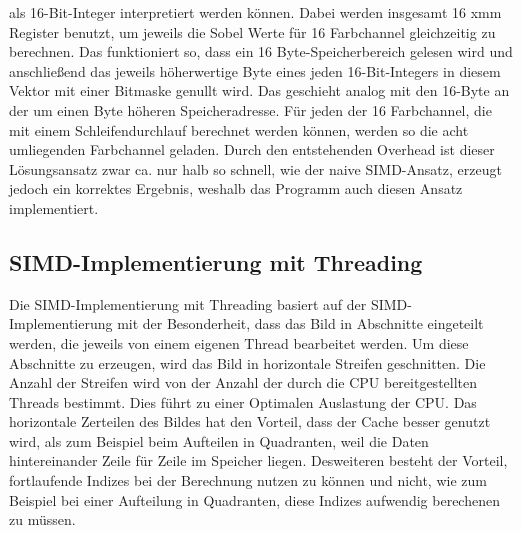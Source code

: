 \documentclass[course=erap]{aspdoc}
\begin{document}
als 16-Bit-Integer interpretiert werden können.
Dabei werden insgesamt 16 xmm Register benutzt, um jeweils die Sobel Werte für 16 Farbchannel gleichzeitig zu berechnen.
Das funktioniert so, dass ein 16 Byte-Speicherbereich gelesen wird und anschließend das jeweils höherwertige Byte eines jeden
16-Bit-Integers in diesem Vektor mit einer Bitmaske genullt wird.
Das geschieht analog mit den 16-Byte an der um einen Byte höheren Speicheradresse.
Für jeden der 16 Farbchannel, die mit einem Schleifendurchlauf berechnet werden können, werden so die acht umliegenden Farbchannel geladen.
Durch den entstehenden Overhead ist dieser Lösungsansatz zwar ca. nur halb so schnell, wie der naive SIMD-Ansatz, erzeugt jedoch ein korrektes Ergebnis, weshalb das Programm auch diesen Ansatz implementiert.

\subsection{SIMD-Implementierung mit Threading}
\label{sec:simd-threading}
Die SIMD-Implementierung mit Threading basiert auf der SIMD-Implementierung mit der Besonderheit, dass das Bild in Abschnitte eingeteilt werden, die jeweils von einem eigenen Thread bearbeitet werden.
Um diese Abschnitte zu erzeugen, wird das Bild in horizontale Streifen geschnitten.
Die Anzahl der Streifen wird von der Anzahl der durch die CPU bereitgestellten Threads bestimmt.
Dies führt zu einer Optimalen Auslastung der CPU.
Das horizontale Zerteilen des Bildes hat den Vorteil, dass der Cache besser genutzt wird, als zum Beispiel beim Aufteilen in Quadranten, weil die Daten hintereinander Zeile für Zeile im Speicher liegen.
Desweiteren besteht der Vorteil, fortlaufende Indizes bei der Berechnung nutzen zu können und nicht, wie zum Beispiel bei einer Aufteilung in Quadranten, diese Indizes aufwendig berechenen zu müssen.
\end{document}
